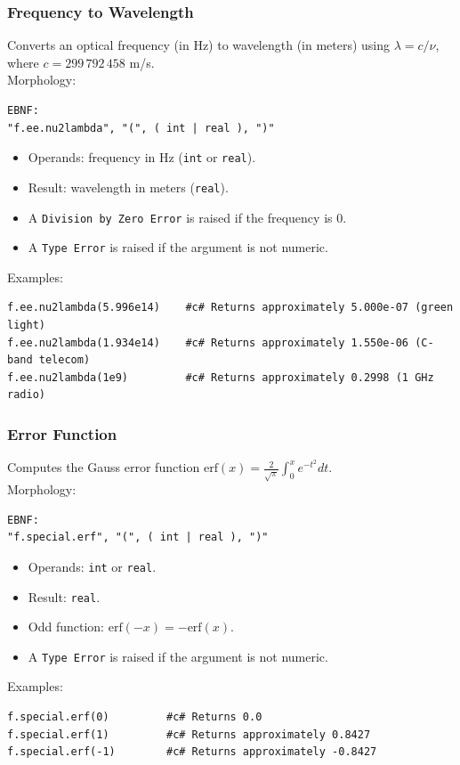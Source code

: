 \subsubsection{Frequency to Wavelength}
Converts an optical frequency (in Hz) to wavelength (in meters) using $\lambda = c / \nu$, where $c = 299\,792\,458$ m/s. \\
Morphology:
\begin{verbatim}
EBNF:
"f.ee.nu2lambda", "(", ( int | real ), ")"
\end{verbatim}
\begin{itemize}
\item Operands: frequency in Hz (\texttt{int} or \texttt{real}).
\item Result: wavelength in meters (\texttt{real}).
\item A \texttt{Division by Zero Error} is raised if the frequency is $0$.
\item A \texttt{Type Error} is raised if the argument is not numeric.
\end{itemize}
Examples:
\begin{verbatim}
f.ee.nu2lambda(5.996e14)    #c# Returns approximately 5.000e-07 (green light)
f.ee.nu2lambda(1.934e14)    #c# Returns approximately 1.550e-06 (C-band telecom)
f.ee.nu2lambda(1e9)         #c# Returns approximately 0.2998 (1 GHz radio)
\end{verbatim}

\subsubsection{Error Function}
Computes the Gauss error function $\text{erf}(x) = \frac{2}{\sqrt{\pi}} \int_0^x e^{-t^2} dt$. \\
Morphology:
\begin{verbatim}
EBNF:
"f.special.erf", "(", ( int | real ), ")"
\end{verbatim}
\begin{itemize}
\item Operands: \texttt{int} or \texttt{real}.
\item Result: \texttt{real}.
\item Odd function: $\text{erf}(-x) = -\text{erf}(x)$.
\item A \texttt{Type Error} is raised if the argument is not numeric.
\end{itemize}
Examples:
\begin{verbatim}
f.special.erf(0)         #c# Returns 0.0
f.special.erf(1)         #c# Returns approximately 0.8427
f.special.erf(-1)        #c# Returns approximately -0.8427
\end{verbatim}

